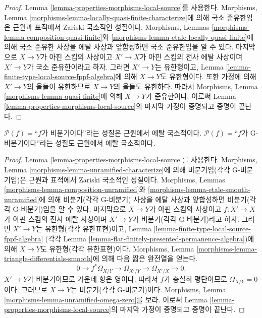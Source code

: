 \begin{proof}
Lemma \ref{lemma-properties-morphisms-local-source}를 사용한다.
Morphisms, Lemma
\ref{morphisms-lemma-locally-quasi-finite-characterize}에 의해
국소 준유한임은 근원과 표적에서 Zariski 국소적인 성질이다.
Morphisms, Lemmas \ref{morphisms-lemma-composition-quasi-finite}와
\ref{morphisms-lemma-etale-locally-quasi-finite}에 의해 국소 준유한
사상을 에탈 사상과 앞합성하면 국소 준유한임을 알 수 있다.
마지막으로 $X \to Y$가 아핀 스킴의 사상이고 $X' \to X$가 아핀
스킴의 전사 에탈 사상이며 $X' \to Y$가 국소 준유한이라고 하자.
그러면 $X' \to Y$는 유한형이고, Lemma
\ref{lemma-finite-type-local-source-fppf-algebra}에 의해 $X \to Y$도
유한형이다. 또한 가정에 의해 $X' \to Y$의 올들이 유한하므로
$X \to Y$의 올들도 유한하다. 따라서 Morphisms, Lemma
\ref{morphisms-lemma-quasi-finite}에 의해 $X \to Y$가 준유한이다.
이로써 Lemma \ref{lemma-properties-morphisms-local-source}의 마지막
가정이 증명되고 증명이 끝난다.
\end{proof}

\begin{lemma}
\label{lemma-unramified-etale-local-source}
$\mathcal{P}(f)=$``$f$가 비분기이다''라는 성질은
근원에서 에탈 국소적이다.
$\mathcal{P}(f)=$``$f$가 G-비분기이다''라는 성질도
근원에서 에탈 국소적이다.
\end{lemma}

\begin{proof}
Lemma \ref{lemma-properties-morphisms-local-source}를 사용한다.
Morphisms, Lemma \ref{morphisms-lemma-unramified-characterize}에 의해
비분기임(각각 G-비분기임)은 근원과 표적에서 Zariski 국소적인
성질이다. Morphisms, Lemmas
\ref{morphisms-lemma-composition-unramified}와
\ref{morphisms-lemma-etale-smooth-unramified}에 의해 비분기(각각
G-비분기) 사상을 에탈 사상과 앞합성하면 비분기(각각 G-비분기)임을
알 수 있다. 마지막으로 $X \to Y$가 아핀 스킴의 사상이고
$f : X' \to X$가 아핀 스킴의 전사 에탈 사상이며 $X' \to Y$가
비분기(각각 G-비분기)라고 하자. 그러면 $X' \to Y$는 유한형(각각
유한표현)이고, Lemma \ref{lemma-finite-type-local-source-fppf-algebra}
(각각 Lemma \ref{lemma-flat-finitely-presented-permanence-algebra})에
의해 $X \to Y$도 유한형(각각 유한표현)이다. Morphisms, Lemma
\ref{morphisms-lemma-triangle-differentials-smooth}에 의해 다음 짧은
완전열을 얻는다.
$$
0 \to f^*\Omega_{X/Y} \to \Omega_{X'/Y} \to \Omega_{X'/X} \to 0.
$$
$X' \to Y$가 비분기이므로 가운데 항은 영이다. 따라서 $f$가
충실히 평탄이므로 $\Omega_{X/Y} = 0$이다. 그러므로 $X \to Y$는
비분기(각각 G-비분기)이다. Morphisms, Lemma
\ref{morphisms-lemma-unramified-omega-zero}를 보라. 이로써 Lemma
\ref{lemma-properties-morphisms-local-source}의 마지막 가정이
증명되고 증명이 끝난다.
\end{proof}




